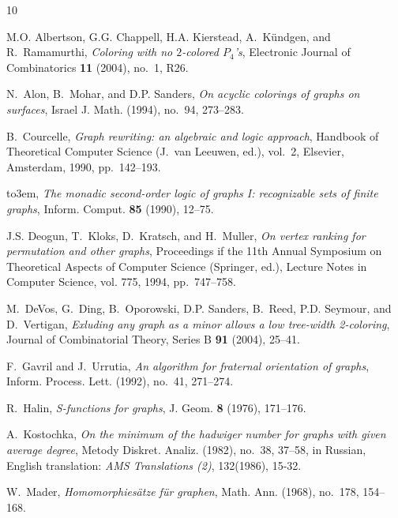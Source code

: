 \documentclass[a4paper]{amsart}
\theoremstyle{definition}
\theoremstyle{remark}
\begin{document}
\providecommand{\bysame}{\leavevmode\hbox to3em{\hrulefill}\thinspace}
\providecommand{\MR}{\relax\ifhmode\unskip\space\fi MR }
\providecommand{\MRhref}[2]{%
  \href{http://www.ams.org/mathscinet-getitem?mr=#1}{#2}
}
\providecommand{\href}[2]{#2}
\begin{thebibliography}{10}

M.O. Albertson, G.G. Chappell, H.A. Kierstead, A.~K{\"u}ndgen, and
  R.~Ramamurthi, \emph{Coloring with no $2$-colored {$P_4$'s}}, Electronic
  Journal of Combinatorics \textbf{11} (2004), no.~1, {R26}.

N.~Alon, B.~Mohar, and D.P. Sanders, \emph{On acyclic colorings of graphs on
  surfaces}, Israel J. Math. (1994), no.~94, 273--283.

B.~Courcelle, \emph{Graph rewriting: an algebraic and logic approach}, Handbook
  of {T}heoretical {C}omputer {S}cience (J.~van Leeuwen, ed.), vol.~2,
  Elsevier, Amsterdam, 1990, pp.~142--193.

\bysame, \emph{The monadic second-order logic of graphs {I}: recognizable sets
  of finite graphs}, Inform. Comput. \textbf{85} (1990), 12--75.

J.S. Deogun, T.~Kloks, D.~Kratsch, and H.~Muller, \emph{On vertex ranking for
  permutation and other graphs}, Proceedings if the 11th Annual Symposium on
  Theoretical Aspects of Computer Science (Springer, ed.), Lecture Notes in
  Computer Science, vol. 775, 1994, pp.~747--758.

M.~DeVos, G.~Ding, B.~Oporowski, D.P. Sanders, B.~Reed, P.D. Seymour, and
  D.~Vertigan, \emph{Exluding any graph as a minor allows a low tree-width
  2-coloring}, Journal of Combinatorial Theory, Series B \textbf{91} (2004),
  25--41.

F.~Gavril and J.~Urrutia, \emph{An algorithm for fraternal orientation of
  graphs}, Inform. Process. Lett. (1992), no.~41, 271--274.

R.~Halin, \emph{S-functions for graphs}, J. Geom. \textbf{8} (1976), 171--176.

A.~Kostochka, \emph{On the minimum of the hadwiger number for graphs with given
  average degree}, Metody Diskret. Analiz. (1982), no.~38, 37--58, in Russian,
  English translation: {\em AMS Translations (2)}, 132(1986), 15-32.

W.~Mader, \emph{Homomorphies\" atze f\" ur graphen}, Math. Ann. (1968),
  no.~178, 154--168.


\end{thebibliography}
\end{document}
